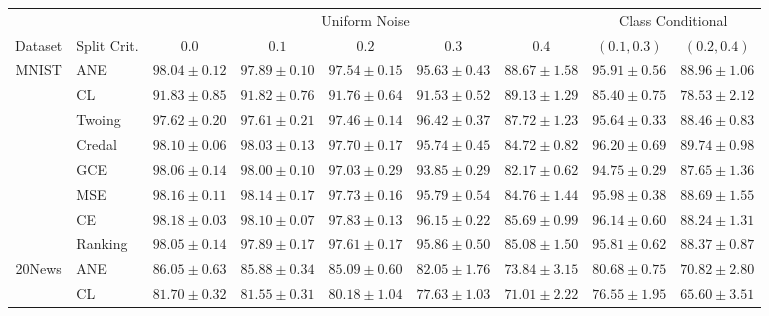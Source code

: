 \documentclass[letterpaper]{article} %
\begin{document}
\begin{table}[t]
	\scriptsize
	\centering
	\begin{tabular}{clccccccc}
&& \multicolumn{5}{c}{Uniform Noise} & \multicolumn{2}{c}{Class Conditional} \\ \cline{3-9}
Dataset & Split Crit. & $0.0$ & $0.1$ & $0.2$ & $0.3$ & $0.4$ & $(0.1,0.3)$ & $(0.2,0.4)$  \\ \hline
\multirow{8}{*}{MNIST}
 & ANE    & $98.04 \pm 0.12$ & $97.89 \pm 0.10$ & $97.54 \pm 0.15$ & $95.63 \pm 0.43$ & $\mathbf{88.67 \pm 1.58}$ & $\mathbf{95.91 \pm 0.56}$ & $\mathbf{88.96 \pm 1.06}$ \\
 & CL     & $91.83 \pm 0.85$ & $91.82 \pm 0.76$ & $91.76 \pm 0.64$ & $91.53 \pm 0.52$ & $\mathbf{89.13 \pm 1.29}$ & $85.40 \pm 0.75$ & $78.53 \pm 2.12$ \\
 & Twoing & $97.62 \pm 0.20$ & $97.61 \pm 0.21$ & $97.46 \pm 0.14$ & $\mathbf{96.42 \pm 0.37}$ & $\mathbf{87.72 \pm 1.23}$ & $\mathbf{95.64 \pm 0.33}$ & $\mathbf{88.46 \pm 0.83}$ \\
 & Credal & $98.10 \pm 0.06$ & $\mathbf{98.03 \pm 0.13}$ & $\mathbf{97.70 \pm 0.17}$ & $95.74 \pm 0.45$ & $84.72 \pm 0.82$ & $\mathbf{96.20 \pm 0.69}$ & $\mathbf{89.74 \pm 0.98}$ \\
 & GCE    & $\mathbf{98.06 \pm 0.14}$ & $\mathbf{98.00 \pm 0.10}$ & $97.03 \pm 0.29$ & $93.85 \pm 0.29$ & $82.17 \pm 0.62$ & $94.75 \pm 0.29$ & $87.65 \pm 1.36$ \\
 & MSE    & $\mathbf{98.16 \pm 0.11}$ & $\mathbf{98.14 \pm 0.17}$ & $\mathbf{97.73 \pm 0.16}$ & $\mathbf{95.79 \pm 0.54}$ & $84.76 \pm 1.44$ & $\mathbf{95.98 \pm 0.38}$ & $\mathbf{88.69 \pm 1.55}$ \\
 & CE     & $\mathbf{98.18 \pm 0.03}$ & $\mathbf{98.10 \pm 0.07}$ & $\mathbf{97.83 \pm 0.13}$ & $\mathbf{96.15 \pm 0.22}$ & $85.69 \pm 0.99$ & $\mathbf{96.14 \pm 0.60}$ & $\mathbf{88.24 \pm 1.31}$ \\
 & Ranking & $98.05 \pm 0.14$ & $\mathbf{97.89 \pm 0.17}$ & $\mathbf{97.61 \pm 0.17}$ & $\mathbf{95.86 \pm 0.50}$ & $85.08 \pm 1.50$ & $\mathbf{95.81 \pm 0.62}$ & $\mathbf{88.37 \pm 0.87}$ \\
\hline
\multirow{8}{*}{20News}
 & ANE    & $\mathbf{86.05 \pm 0.63}$ & $\mathbf{85.88 \pm 0.34}$ & $\mathbf{85.09 \pm 0.60}$ & $\mathbf{82.05 \pm 1.76}$ & $\mathbf{73.84 \pm 3.15}$ & $\mathbf{80.68 \pm 0.75}$ & $\mathbf{70.82 \pm 2.80}$ \\
 & CL     & $81.70 \pm 0.32$ & $81.55 \pm 0.31$ & $80.18 \pm 1.04$ & $77.63 \pm 1.03$ & $71.01 \pm 2.22$ & $76.55 \pm 1.95$ & $65.60 \pm 3.51$ \\

\end{tabular}
\end{table}
\end{document}
